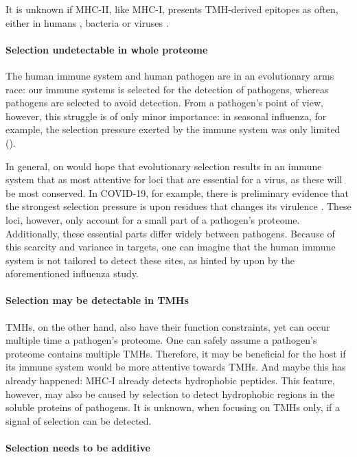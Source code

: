 It is unknown if MHC-II, like MHC-I, 
presents TMH-derived epitopes as often, either 
in humans ,
bacteria 
or viruses .

\paragraph{Selection undetectable in whole proteome}

The human immune system and human pathogen are in an evolutionary
arms race: our immune systems is selected for the detection
of pathogens, whereas pathogens are selected to avoid detection.
From a pathogen's point of view, however, this struggle 
is of only minor importance:
in seasonal influenza, for example, the selection pressure
exerted by the immune system was only limited (\cite{han2019individual}).

In general, on would hope that evolutionary selection results in
an immune system that as most attentive for loci that are
essential for a virus, as these will be most conserved.
In COVID-19, for example, there is preliminary evidence that the strongest
selection pressure is upon residues that changes its 
virulence \cite{velazquez2020positive}.
These loci, however, only account for a small part of a pathogen's proteome.
Additionally, these essential parts differ widely between pathogens.
Because of this scarcity and variance in targets, 
one can imagine that the human immune system 
is not tailored to detect these sites, 
as hinted by upon by the aforementioned influenza study.

\paragraph{Selection may be detectable in TMHs}

TMHs, on the other hand, also have their function constraints, 
yet can occur multiple time a pathogen's proteome.
One can safely assume a pathogen's proteome contains multiple TMHs.
Therefore, it may be beneficial for the host
if its immune system would be more attentive towards TMHs.
And maybe this has already happened: MHC-I already detects hydrophobic
peptides. This feature, however, may also be caused by selection
to detect hydrophobic regions in the soluble proteins of pathogens.
It is unknown, when focusing on TMHs only, if a signal of selection
can be detected.

\paragraph{Selection needs to be additive}

